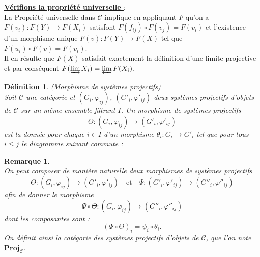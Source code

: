 \documentclass[a4paper, 14pt]{report}
\newtheorem{definition}{Définition}[section]
\newtheorem{remark}{Remarque}[section]
\begin{document}
\begin{onehalfspace}
{			\textbf{\underline{Vérifions la propriété universelle }}: \\
			
La Propriété universelle dans \( \mathcal{C} \) implique en appliquant \( F \) qu'on a \( F(v_i): F(Y) \to F(X_i) \) satisfont \( F(f_{ij}) \circ F(v_j) = F(v_i) \) et l'existence d'un morphisme unique \( F(v): F(Y) \to F(X) \) tel que \( F(u_i) \circ F(v) = F(v_i) \).\\
			
Il en résulte que \( F(X) \) satisfait exactement la définition d’une limite projective et par conséquent \(F(\varinjlim X_i) = \varprojlim F(X_i).\)\\
			
			
			
			
			\begin{definition} (Morphisme de systèmes projectifs) \cite{guglielmetti2025profinite}\\
Soit $\mathcal{C}$ une catégorie et $(G_i, \varphi_{ij})$, $(G'_i, \varphi'_{ij})$ deux systèmes projectifs d'objets de $\mathcal{C}$ sur un même ensemble filtrant $I$. Un morphisme de systèmes projectifs 
				\[
				\Theta : (G_i, \varphi_{ij}) \longrightarrow (G'_i, \varphi'_{ij})
				\]
				est la donnée pour chaque $i \in I$ d'un morphisme $\theta_i : G_i \to G'_i$ tel que pour tous $i \leq j$ le diagramme suivant commute :
				
				
				\begin{center}
				\end{center}
				
			\end{definition}
			
			
			\begin{remark} \cite{guglielmetti2025profinite}\\
				On peut composer de manière naturelle deux morphismes de systèmes projectifs
				\[
				\Theta : (G_i, \varphi_{ij}) \longrightarrow (G'_i, \varphi'_{ij}) \quad \text{et} \quad \Psi : (G'_i, \varphi'_{ij}) \longrightarrow (G''_i, \varphi''_{ij})
				\]
				afin de donner le morphisme
				\[
				\Psi \circ \Theta : (G_i, \varphi_{ij}) \longrightarrow (G''_i, \varphi''_{ij})
				\]
				dont les composantes sont :
				\[
				(\Psi \circ \Theta)_i = \psi_i \circ \theta_i.
				\]
On définit ainsi la catégorie des systèmes projectifs d'objets de $\mathcal{C}$, que l'on note $\mathbf{Proj}_{\mathcal{C}}$.
			\end{remark}
			
}
\end{onehalfspace}
\end{document}
